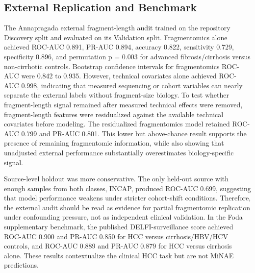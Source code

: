 \documentclass[conference]{IEEEtran}
\begin{document}
\subsection{External Replication and Benchmark}
The Annapragada external fragment-length audit trained on the repository Discovery split and evaluated on its Validation split. Fragmentomics alone achieved ROC-AUC 0.891, PR-AUC 0.894, accuracy 0.822, sensitivity 0.729, specificity 0.896, and permutation p = 0.003 for advanced fibrosis/cirrhosis versus non-cirrhotic controls. Bootstrap confidence intervals for fragmentomics ROC-AUC were 0.842 to 0.935. However, technical covariates alone achieved ROC-AUC 0.998, indicating that measured sequencing or cohort variables can nearly separate the external labels without fragment-size biology. To test whether fragment-length signal remained after measured technical effects were removed, fragment-length features were residualized against the available technical covariates before modeling. The residualized fragmentomics model retained ROC-AUC 0.799 and PR-AUC 0.801. This lower but above-chance result supports the presence of remaining fragmentomic information, while also showing that unadjusted external performance substantially overestimates biology-specific signal.

Source-level holdout was more conservative. The only held-out source with enough samples from both classes, INCAP, produced ROC-AUC 0.699, suggesting that model performance weakens under stricter cohort-shift conditions. Therefore, the external audit should be read as evidence for partial fragmentomic replication under confounding pressure, not as independent clinical validation. In the Foda supplementary benchmark, the published DELFI-surveillance score achieved ROC-AUC 0.900 and PR-AUC 0.850 for HCC versus cirrhosis/HBV/HCV controls, and ROC-AUC 0.889 and PR-AUC 0.879 for HCC versus cirrhosis alone. These results contextualize the clinical HCC task but are not MiNAE predictions.
\end{document}
